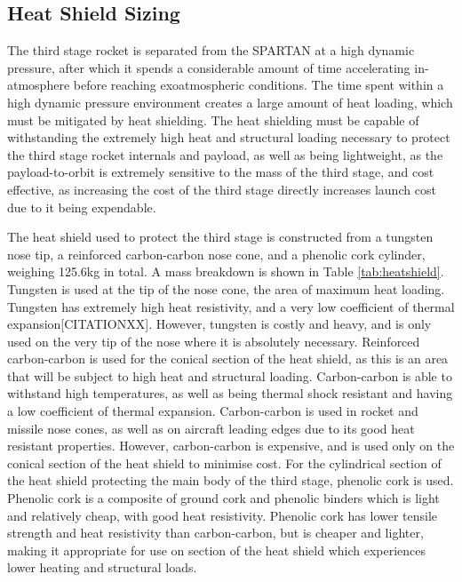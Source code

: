 \subsection{Heat Shield Sizing}

The third stage rocket is separated from the SPARTAN at a high dynamic pressure, after which it spends a considerable amount of time accelerating in-atmosphere before reaching exoatmospheric conditions. The time spent within a high dynamic pressure environment creates a large amount of heat loading, which must be mitigated by heat shielding. The heat shielding must be capable of withstanding the extremely high heat and structural loading necessary to protect the third stage rocket internals and payload, as well as being lightweight, as the payload-to-orbit is extremely sensitive to the mass of the third stage, and cost effective, as increasing the cost of the third stage directly increases launch cost due to it being expendable. 


The heat shield used to protect the third stage is constructed from a tungsten nose tip, a reinforced carbon-carbon nose cone, and a phenolic cork cylinder, weighing 125.6kg in total. A mass breakdown is shown in Table \ref{tab:heatshield}.
Tungsten is used at the tip of the nose cone, the area of maximum heat loading. Tungsten has extremely high heat resistivity, and a very low coefficient of thermal expansion[CITATIONXX]. However, tungsten is costly and heavy, and is only used on the very tip of the nose where it is absolutely necessary. 
  Reinforced carbon-carbon is used for the conical section of the heat shield, as this is an area that will be subject to high heat and structural loading. Carbon-carbon is able to withstand high temperatures, as well as being thermal shock resistant and having a low coefficient of thermal expansion\cite{Fitzer}. Carbon-carbon is used in rocket and missile nose cones, as well as on aircraft leading edges due to its good heat resistant properties\cite{Fitzer}. However, carbon-carbon is expensive, and is used only on the conical section of the heat shield to minimise cost. For the cylindrical section of the heat shield protecting the main body of the third stage, phenolic cork is used. Phenolic cork is a composite of ground cork and phenolic binders which is light and relatively cheap, with good heat resistivity. Phenolic cork has lower tensile strength and heat resistivity than carbon-carbon\cite{Composites,Fitzer}, but is cheaper and lighter, making it appropriate for use on section of the heat shield which experiences lower heating and structural loads. 

